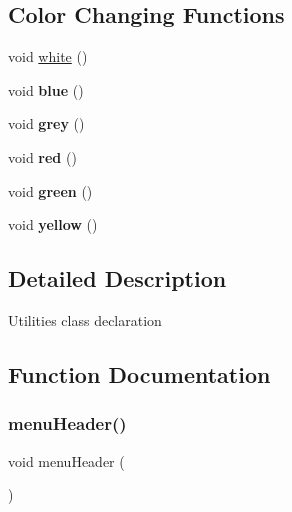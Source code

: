 \subsection*{Color Changing Functions}
\begin{DoxyCompactItemize}
\item 
void \hyperlink{group___utilities_gac0fd834412eb7d5311f137d919db6788}{white} ()
\item 
\mbox{\label{group___utilities_ga161aec8a96c389795d228ca0c3a949d5}} 
void {\bfseries blue} ()
\item 
\mbox{\label{group___utilities_ga49186144f01dc357bb79e2c7f0083039}} 
void {\bfseries grey} ()
\item 
\mbox{\label{group___utilities_ga39abd40f68d03c40857be1e74407efb9}} 
void {\bfseries red} ()
\item 
\mbox{\label{group___utilities_ga0df115437fbb77c0311e65300c65289e}} 
void {\bfseries green} ()
\item 
\mbox{\label{group___utilities_gab0c10e6284be130a7973fa029a690ef7}} 
void {\bfseries yellow} ()
\end{DoxyCompactItemize}


\subsection{Detailed Description}
Utilities class declaration 

\subsection{Function Documentation}
\mbox{\label{group___utilities_ga1f9f149ec48673e7862677749634b84f}} 
\subsubsection{\texorpdfstring{menu\+Header()}{menuHeader()}}
{\footnotesize\ttfamily void menu\+Header (\begin{DoxyParamCaption}{ }\end{DoxyParamCaption})}



